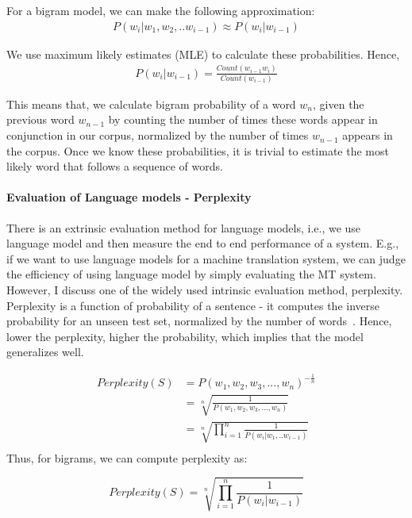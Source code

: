 For a bigram model, we can make the following approximation:
\begin{align}
 P(w_i|w_1,w_2,..w_{i-1}) \approx P(w_i|w_{i-1})
\end{align}

We use maximum likely estimates (MLE) to calculate these probabilities. Hence,
\begin{align}
    P(w_i|w_{i-1}) = \frac{Count(w_{i-1}w_i)}{Count(w_{i-1})}
\end{align}

This means that, we calculate bigram probability of a word $w_n$, given the previous word $w_{n-1}$ by counting the number of times these words appear in conjunction in our corpus, normalized by the number of times $w_{n-1}$ appears in the corpus. 
Once we know these probabilities, it is trivial to estimate the most likely word that follows a sequence of words.  

\paragraph*{Evaluation of Language models - Perplexity}

There is an extrinsic evaluation method for language models, i.e., we use language model and then measure the end to end performance of a system. E.g., if we want to use language models for a machine translation system, we can judge the efficiency of using language model by simply evaluating the MT system. However, I discuss one of the widely used intrinsic evaluation method, perplexity. Perplexity is a function of probability of a sentence - it computes the inverse probability for an unseen test set, normalized by the number of words~\citep{jurafsky2014speech}. Hence, lower the perplexity, higher the probability, which implies that the model generalizes well.


\begin{equation}
    \begin{aligned}
    Perplexity(S) & = P(w_1,w_2,w_3, ... , w_n)^{-\frac{1}{n}} \\
    & = \sqrt[n]{\frac{1}{P(w_1,w_2,w_3, ... , w_n)}} \\
    & = \sqrt[n]{\prod_{i=1}^{n}\frac{1}{P(w_i|w_1, .. w_{i-1})}} \\
    \end{aligned}
\end{equation}
Thus, for bigrams, we can compute perplexity as:

\begin{equation}
    Perplexity(S) = \sqrt[n]{\prod_{i=1}^{n}\frac{1}{P(w_i|w_{i-1})}}
\end{equation}
    
